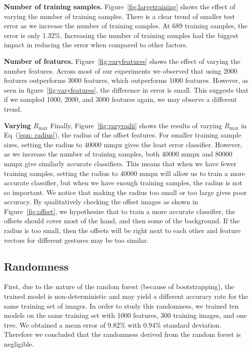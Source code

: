 \textbf{Number of training samples.} Figure~\ref{fig:largetraining} shows the effect of varying the number of training samples. There is a clear trend of smaller test error as we increase the number of training samples. At 689 training samples, the error is only 1.32\%. Increasing the number of training samples had the biggest impact in reducing the error when compared to other factors. 
\cutequation

\textbf{Number of features.} Figure~\ref{fig:varyfeatures} shows the effect of varying the number features. Across most of our experiments we observed that using 2000 features outperforms 3000 features, which outperforms 1000 features. However, as seen in figure~\ref{fig:varyfeatures}, the difference in error is small. This suggests that if we sampled 1000, 2000, and 3000 features again, we may observe a different trend.
\cutequation

\textbf{Varying $R_{\text{max}}$}
Finally, Figure~\ref{fig:varyradii} shows the results of varying $R_{\text{max}}$ in Eq~(\ref{eqn: radius}), the radius of the offset features. For smaller training sample sizes, setting the radius to 40000 mmpx gives the least error classifier. However, as we increase the number of training samples, both 40000 mmpx and 80000 mmpx give similarly accurate classifiers. This means that when we have fewer training samples, setting the radius to 40000 mmpx will allow us to train a more accurate classifier, but when we have enough training samples, the radius is not so important. We notice that making the radius too small or too large gives poor accuracy. By qualitatively checking the offset images as shown in Figure~\ref{fig:offset}, we hypothesize that to train a more accurate classifier, the offsets should cover most of the hand, and then some of the background. If the radius is too small, then the offsets will be right next to each other and feature vectors for different gestures may be too similar.

\cutsubsection
\subsection{ Randomness }
\cutsubsection
First, due to the nature of the random forest (because of bootstrapping), the trained model is non-deterministic and may yield a different accuracy rate for the same training set of images. In order to study this randomness, we trained ten models on the same training set with 1000 features, 300 training images, and one tree. We obtained a mean error of 9.82\% with 0.94\% standard deviation. Therefore we concluded that the randomness derived from the random forest is negligible. 

